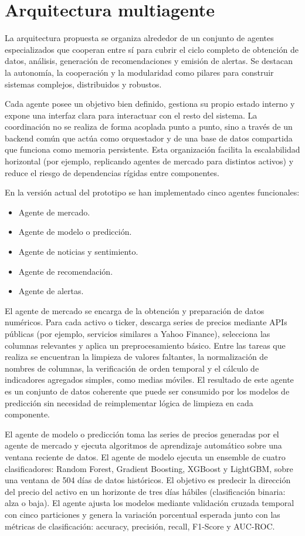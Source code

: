 \section{Arquitectura multiagente}

La arquitectura propuesta se organiza alrededor de un conjunto de agentes especializados que cooperan entre sí para cubrir el ciclo completo de obtención de datos, análisis, generación de recomendaciones y emisión de alertas. Se destacan la autonomía, la cooperación y la modularidad como pilares para construir sistemas complejos, distribuidos y robustos.

Cada agente posee un objetivo bien definido, gestiona su propio estado interno y expone una interfaz clara para interactuar con el resto del sistema. La coordinación no se realiza de forma acoplada punto a punto, sino a través de un backend común que actúa como orquestador y de una base de datos compartida que funciona como memoria persistente. Esta organización facilita la escalabilidad horizontal (por ejemplo, replicando agentes de mercado para distintos activos) y reduce el riesgo de dependencias rígidas entre componentes.

En la versión actual del prototipo se han implementado cinco agentes funcionales:

\begin{itemize}
    \item Agente de mercado.
    \item Agente de modelo o predicción.
    \item Agente de noticias y sentimiento.
    \item Agente de recomendación.
    \item Agente de alertas.
\end{itemize}

El agente de mercado se encarga de la obtención y preparación de datos numéricos. Para cada activo o ticker, descarga series de precios mediante APIs públicas (por ejemplo, servicios similares a Yahoo Finance), selecciona las columnas relevantes y aplica un preprocesamiento básico. Entre las tareas que realiza se encuentran la limpieza de valores faltantes, la normalización de nombres de columnas, la verificación de orden temporal y el cálculo de indicadores agregados simples, como medias móviles. El resultado de este agente es un conjunto de datos coherente que puede ser consumido por los modelos de predicción sin necesidad de reimplementar lógica de limpieza en cada componente.

El agente de modelo o predicción toma las series de precios generadas por el agente de mercado y ejecuta algoritmos de aprendizaje automático sobre una ventana reciente de datos. El agente de modelo  ejecuta un ensemble de
  cuatro clasificadores: Random Forest, Gradient Boosting, XGBoost y LightGBM, sobre una ventana de   504 días de datos históricos. El objetivo es predecir la dirección del precio del activo en un
  horizonte de tres días hábiles (clasificación binaria: alza o baja). El agente ajusta los modelos   mediante validación cruzada temporal con cinco particiones y genera la variación porcentual      
  esperada junto con las métricas de clasificación: accuracy, precisión, recall, F1-Score y    
  AUC-ROC. 
  
